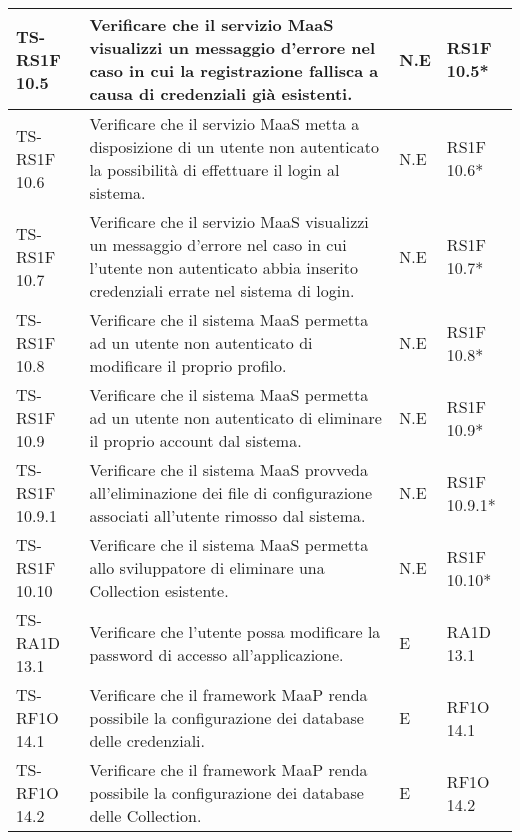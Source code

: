 \begin{center}
\begin{longtable}{| p{3cm} | p{6cm} | p{1.5cm} | p{2cm} | }
				TS-RS1F 10.5 & 
				Verificare che il servizio MaaS visualizzi un messaggio d’errore nel caso in cui la registrazione fallisca a causa di credenziali già esistenti. & N.E & RS1F 10.5*  \newline  \\ \hline 
				TS-RS1F 10.6 & 
				Verificare che il servizio MaaS metta a disposizione di un utente non autenticato la possibilità di effettuare il login al sistema. & N.E & RS1F 10.6*  \newline  \\ \hline 
				TS-RS1F 10.7 & 
				Verificare che il servizio MaaS visualizzi un messaggio d’errore nel caso in cui l’utente non autenticato abbia inserito credenziali errate nel sistema di login. & N.E & RS1F 10.7*  \newline  \\ \hline 
				TS-RS1F 10.8 & 
				Verificare che il sistema MaaS permetta ad un utente non autenticato di modificare il proprio profilo. & N.E & RS1F 10.8*  \newline  \\ \hline 
				TS-RS1F 10.9 & 
				Verificare che il sistema MaaS permetta ad un utente non autenticato di eliminare il proprio account dal sistema. & N.E & RS1F 10.9*  \newline  \\ \hline 
				TS-RS1F 10.9.1 & 
				Verificare che il sistema MaaS provveda all'eliminazione dei file di configurazione associati all'utente rimosso dal sistema. & N.E & RS1F 10.9.1*  \newline  \\ \hline 
				TS-RS1F 10.10 & 
				Verificare che il sistema MaaS permetta allo sviluppatore di eliminare una Collection esistente. & N.E & RS1F 10.10*  \newline  \\ \hline 
				TS-RA1D 13.1 & 
				Verificare che l’utente possa modificare la password di accesso all'applicazione. & E & RA1D 13.1 \newline  \\ \hline 
				TS-RF1O 14.1 & 
				Verificare che il framework MaaP renda possibile la configurazione dei database delle credenziali. & E & RF1O 14.1 \newline  \\ \hline 
				TS-RF1O 14.2 & 
				Verificare che il framework MaaP renda possibile la configurazione dei database delle Collection. & E & RF1O 14.2 \newline  \\ \hline 

\end{longtable}
\end{center}

